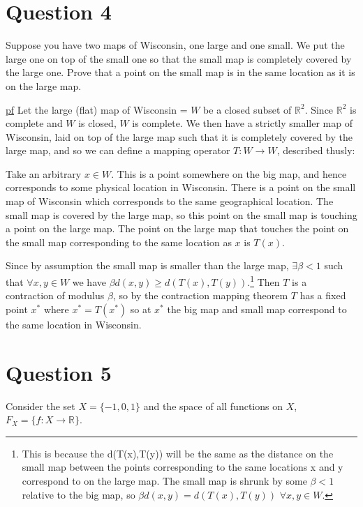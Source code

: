 \documentclass[11pt]{article} %
\begin{document}
\section{Question 4}
Suppose you have two maps of Wisconsin, one large and one small. We put the large one on top of the small one so that the small map is completely covered by the large one. Prove that a point on the small map is in the same location as it is on the large map.

\underline{pf} Let the large (flat) map of Wisconsin = $W$ be a closed subset of $\mathbb{R}^2$. Since $\mathbb{R}^2$ is complete and $W$ is closed, $W$ is complete. We then have a strictly smaller map of Wisconsin, laid on top of the large map such that it is completely covered by the large map, and so we can define a mapping operator $T: W \rightarrow W$, described thusly: 

Take an arbitrary $x \in W$. This is a point somewhere on the big map, and hence corresponds to some physical location in Wisconsin. There is a point on the small map of Wisconsin which corresponds to the same geographical location. The small map is covered by the large map, so this point on the small map is touching a point on the large map. The point on the large map that touches the point on the small map corresponding to the same location as $x$ is $T(x)$.

Since by assumption the small map is smaller than the large map, $\exists \beta <1$ such that $\forall x,y \in W$ we have $\beta d(x,y)\geq d(T(x),T(y)).$\footnote{This is because the d(T(x),T(y)) will be the same as the distance on the small map between the points corresponding to the same locations  x and y correspond to on the large map. The small map is shrunk by some $\beta <1$ relative to the big map, so $\beta d(x,y) = d(T(x),T(y))$ $\forall x,y \in W.$ } Then $T$ is a contraction of modulus $\beta$, so by the contraction mapping theorem $T$ has a fixed point $x^*$ where $x^* = T(x^*)$ so at $x^*$ the big map and small map correspond to the same location in Wisconsin.

\section{Question 5}
Consider the set $X = \{ -1, 0, 1 \}$ and the space of all functions on $X$, $F_X = \{ f: X \rightarrow \mathbb{R} \}$.
\end{document}

